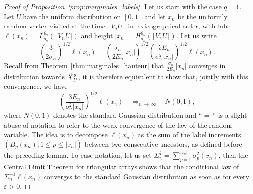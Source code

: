 \documentclass[10pt]{amsart}
\theoremstyle{definition}\newtheorem{defi}[theo]{Definition}\newtheorem{rema}[theo]{Remark}\newtheorem{exam}[theo]{Example}\newtheorem{exem}[theo]{Example}\newtheorem{nota}[theo]{Notation}
\newcommand{\1}{\ensembles{1}}
\newcommand{\tildep}[1]{\widetilde{#1}\vphantom{#1}}
\renewcommand{\le}{\leqslant}
\newcommand{\Nmap}{N}
\newcommand{\Hfn}{H_{d_n}^{\varrho_n}}
\newcommand{\Lfn}{L_{d_n}^{\varrho_n}}
\newcommand{\tX}{\tildep{X}^{\varrho}}
\newcommand{\edges}{E}
\newcommand{\vertices}{V}
\providecommand{\?}{}
\begin{document}
\begin{proof}[Proof of Proposition~\ref{prop:marginales_labels}]
Let us start with the case $q=1$. Let $U$ have the uniform distribution on $[0,1]$ and let $x_n$ be the uniformly random vertex visited at the time $\lfloor \vertices_n U \rfloor$ in lexicographical order, with label $\ell(x_n) = \Lfn(\lfloor \vertices_n U \rfloor)$ and height $|x_n| = \Hfn(\lfloor \vertices_n U \rfloor)$. Let us write
\[
\left(\frac{3}{2\sigma_n}\right)^{1/2} \ell(x_n) = \left(\frac{\sigma_n}{2 \edges_n} |x_n|\right)^{1/2} \left(\frac{3 \edges_n}{\sigma_n^2 |x_n|}\right)^{1/2} \ell(x_n).
\]
Recall from Theorem~\ref{thm:marginales_hauteur} that $\frac{\sigma_n}{2 \edges_n} |x_n|$ converges in distribution towards $\tX_U$, it is therefore equivalent to show that, jointly with this convergence, we have
\begin{equation}\label{eq:cv_label_unif}
\left(\frac{3 \edges_n}{\sigma_n^2 |x_n|}\right)^{1/2} \ell(x_n) \quad\mathop{\Longrightarrow}_{n\,\to\,\infty}\quad \Nmap(0, 1),
\end{equation}
where $\Nmap(0, 1)$ denotes the standard Gaussian distribution and ``$\Rightarrow$'' is a slight abuse of notation to refer to the weak convergence of the law of the random variable. The idea is to decompose $\ell(x_n)$ as the sum of the label increments $(B_p(x_n) ; 1 \le p \le |x_n|)$ between two consecutive ancestors, as defined before the preceding lemma. To ease notation, let us set $\Sigma_n^2 = \sum_{p=1}^{|x_n|} \sigma^2_p(x_n)$, then the Central Limit Theorem for triangular arrays shows that the conditional law of $\Sigma_n^{-1} \ell(x_n)$ converges to the standard Gaussian distribution as soon as for every $\varepsilon > 0$,


\end{proof}
\end{document}
